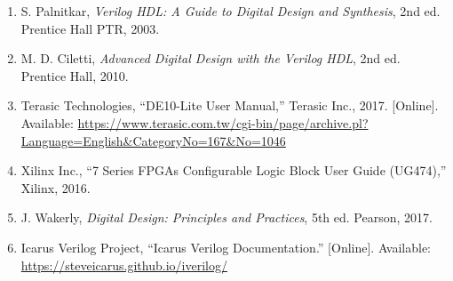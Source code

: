 \documentclass[12pt,a4paper]{article}
\begin{document}
\begin{enumerate}
\item S. Palnitkar, \textit{Verilog HDL: A Guide to Digital Design and Synthesis}, 2nd ed. Prentice Hall PTR, 2003.

\item M. D. Ciletti, \textit{Advanced Digital Design with the Verilog HDL}, 2nd ed. Prentice Hall, 2010.

\item Terasic Technologies, ``DE10-Lite User Manual,'' Terasic Inc., 2017. [Online]. Available: \url{https://www.terasic.com.tw/cgi-bin/page/archive.pl?Language=English\&CategoryNo=167\&No=1046}

\item Xilinx Inc., ``7 Series FPGAs Configurable Logic Block User Guide (UG474),'' Xilinx, 2016.

\item J. Wakerly, \textit{Digital Design: Principles and Practices}, 5th ed. Pearson, 2017.

\item Icarus Verilog Project, ``Icarus Verilog Documentation.'' [Online]. Available: \url{https://steveicarus.github.io/iverilog/}
\end{enumerate}
\end{document}
